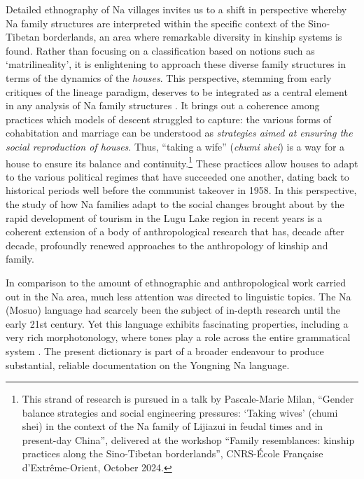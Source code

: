 Detailed ethnography of Na villages \parencite{milan_na_2016,milan_tourisme_2019} invites us to a shift in perspective whereby Na family structures are interpreted within the specific context of the Sino-Tibetan borderlands, an area where remarkable diversity in kinship systems is found. Rather than focusing on a classification based on notions such as ‘matrilineality’, it is enlightening to approach these diverse family structures in terms of the dynamics of the \emph{houses}. This perspective, stemming from early critiques of the lineage paradigm, deserves to be integrated as a central element in any analysis of Na family structures \parencite{zhou_zigong_2003,hosana_2006}. It brings out a coherence among practices which models of descent struggled to capture: the various forms of cohabitation and marriage can be understood as \emph{strategies aimed at ensuring the social reproduction of houses}. Thus, “taking a wife” (\emph{chumi shei}) is a way for a house to ensure its balance and continuity.\footnote{This strand of research is pursued in a talk by Pascale-Marie Milan, “Gender balance strategies and social engineering pressures: ‘Taking wives' (chumi shei) in the context of the Na family of Lijiazui in feudal times and in present-day China”, delivered at the workshop “Family resemblances: kinship practices along the Sino-Tibetan borderlands”, CNRS-École Française d'Extrême-Orient, October 2024.} These practices allow houses to adapt to the various political regimes that have succeeded one another, dating back to historical periods well before the communist takeover in 1958. In this perspective, the study of how Na families adapt to the social changes brought about by the rapid development of tourism in the Lugu Lake region in recent years \parencite{walsh_living_2001,mattison2010,milan_tourisme_2019} is a coherent extension of a body of anthropological research that has, decade after decade, profoundly renewed approaches to the anthropology of kinship and family.

In comparison to the amount of ethnographic and anthropological work carried out in the Na area, much less attention was directed to linguistic topics. The Na (Mosuo) language had scarcely been the subject of in-depth research until the early 21st century. Yet this language exhibits fascinating properties, including a very rich morphotonology, where tones play a role across the entire grammatical system \parencite{michaud2017}. The present dictionary is part of a broader endeavour to produce substantial, reliable documentation on the Yongning Na language.

